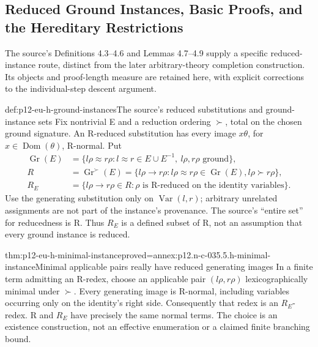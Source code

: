 \subsection{Reduced Ground Instances, Basic Proofs, and the Hereditary Restrictions}
\label{sec:p12-eu-hereditary-source}

The source's Definitions 4.3--4.6 and Lemmas 4.7--4.9 supply a
specific reduced-instance route, distinct from the later arbitrary-theory
completion construction. Its objects and proof-length measure are retained
here, with explicit corrections to the individual-step descent argument.
\cite[pp.~489--495]{BaaderSnyder2001}

\begin{hbdefinition}{def:p12-eu-h-ground-instances}{The source's reduced substitutions and ground-instance sets}
Fix nontrivial E and a reduction ordering \(\succ\), total on the
chosen ground signature. An R-reduced substitution has every image
\(x\theta\), for \(x\in\operatorname{Dom}(\theta)\), R-normal.
Put
\[
\begin{aligned}
 \operatorname{Gr}(E)&=\{l\rho\approx r\rho:
     l\approx r\in E\cup E^{-1},\ l\rho,r\rho\text{ ground}\},\\
 R&=\operatorname{Gr}^{\succ}(E)
   =\{l\rho\to r\rho:l\rho\approx r\rho\in\operatorname{Gr}(E),
                                               l\rho\succ r\rho\},\\
 R_E&=\{l\rho\to r\rho\in R:
          \rho\text{ is R-reduced on the identity variables}\}.
\end{aligned}
\]
Use the generating substitution only on
\(\operatorname{Var}(l,r)\); arbitrary unrelated assignments are
not part of the instance's provenance. The source's ``entire set''
for reducedness is R. Thus \(R_E\) is a defined subset of R,
not an assumption that every ground instance is reduced.
\cite[Definitions 4.3--4.4, pp.~489--490]{BaaderSnyder2001}
\end{hbdefinition}

\begin{hblemma}{thm:p12-eu-h-minimal-instance}{proved=annex:p12.n-c-035.5.h-minimal-instance}{Minimal applicable pairs really have reduced generating images}
In a finite term admitting an R-redex, choose an applicable pair
\((l\rho,r\rho)\) lexicographically minimal under \(\succ\).
Every generating image is R-normal, including variables occurring
only on the identity's right side. Consequently that redex is an
\(R_E\)-redex. R and \(R_E\) have precisely the same normal
terms. The choice is an existence construction, not an effective
enumeration or a claimed finite branching bound.
\end{hblemma}

